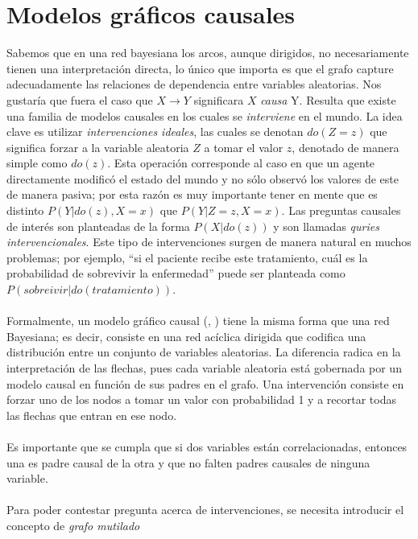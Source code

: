 \documentclass[11pt]{article}
\theoremstyle{plain}
\begin{document}
\section{Modelos gráficos causales}
Sabemos que en una red bayesiana los arcos, aunque dirigidos, no necesariamente tienen una interpretación directa, lo único que importa es que el grafo capture adecuadamente las relaciones de dependencia entre variables aleatorias. Nos gustaría que fuera el caso que $X \to Y$ significara $X$ \textit{causa} Y. Resulta que existe una familia de modelos causales en los cuales se \textit{interviene} en el mundo. La idea clave es utilizar \textit{intervenciones ideales}, las cuales se denotan $do(Z=z)$ que significa forzar a la variable aleatoria $Z$ a tomar el valor $z$, denotado de manera simple como $do(z)$. Esta operación corresponde al caso en que un agente directamente modificó el estado del mundo y no sólo observó los valores de este de manera pasiva; por esta razón es muy importante tener en mente que es distinto $P(Y | do(z), X=x)$ que $P(Y | Z=z, X=x)$. Las preguntas causales de interés son planteadas de la forma $P(X | do(z))$ y son llamadas \textit{quries intervencionales}. Este tipo de intervenciones surgen de manera natural en muchos problemas; por ejemplo, “si el paciente recibe este tratamiento, cuál es la probabilidad de sobrevivir la enfermedad” puede ser planteada como $P(sobreivir | do(tratamiento))$.\\
\\
Formalmente, un modelo gráfico causal (\cite{koller2009probabilistic}, \cite{pearl2014causality}) tiene la misma forma que una red Bayesiana; es decir, consiste en una red acíclica dirigida que codifica una distribución entre un conjunto de variables aleatorias. La diferencia radica en la interpretación de las flechas, pues cada variable aleatoria está gobernada por un modelo causal en función de sus padres en el grafo. Una intervención consiste en forzar uno de los nodos a tomar un valor con probabilidad 1 y a recortar todas las flechas que entran en ese nodo.\\
\\
Es importante que se cumpla que si dos variables están correlacionadas, entonces una es padre causal de la otra y que no falten padres causales de ninguna variable.\\
\\
Para poder contestar pregunta acerca de intervenciones, se necesita introducir el concepto de \textit{grafo mutilado}
\end{document}
